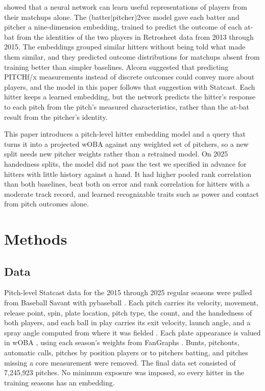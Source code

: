 \documentclass[11pt,letterpaper]{article}
\let\oldsubsection\subsection
\renewcommand\subsection{\FloatBarrier\oldsubsection}
\begin{document}
\citet{alcorn2018} showed that a neural network can learn useful representations of players from their matchups alone. The (batter$|$pitcher)2vec model gave each batter and pitcher a nine-dimension embedding, trained to predict the outcome of each at-bat from the identities of the two players in Retrosheet data from 2013 through 2015. The embeddings grouped similar hitters without being told what made them similar, and they predicted outcome distributions for matchups absent from training better than simpler baselines. Alcorn suggested that predicting PITCHf/x measurements instead of discrete outcomes could convey more about players, and the model in this paper follows that suggestion with Statcast. Each hitter keeps a learned embedding, but the network predicts the hitter's response to each pitch from the pitch's measured characteristics, rather than the at-bat result from the pitcher's identity.

This paper introduces a pitch-level hitter embedding model and a query that turns it into a projected wOBA against any weighted set of pitchers, so a new split needs new pitcher weights rather than a retrained model. On 2025 handedness splits, the model did not pass the test we specified in advance for hitters with little history against a hand. It had higher pooled rank correlation than both baselines, beat both on error and rank correlation for hitters with a moderate track record, and learned recognizable traits such as power and contact from pitch outcomes alone.

\section{Methods}
\label{sec:methods}

\subsection{Data}
\label{sec:data}

Pitch-level Statcast data for the 2015 through 2025 regular seasons were pulled from Baseball Savant \citep{savant} with pybaseball \citep{pybaseball}. Each pitch carries its velocity, movement, release point, spin, plate location, pitch type, the count, and the handedness of both players, and each ball in play carries its exit velocity, launch angle, and a spray angle computed from where it was fielded \citep{albert2024}. Each plate appearance is valued in wOBA \citep{tango2007}, using each season's weights from FanGraphs \citep{fangraphsguts}. Bunts, pitchouts, automatic calls, pitches by position players or to pitchers batting, and pitches missing a core measurement were removed. The final data set consisted of 7,245,923 pitches. No minimum exposure was imposed, so every hitter in the training seasons has an embedding.
\end{document}
